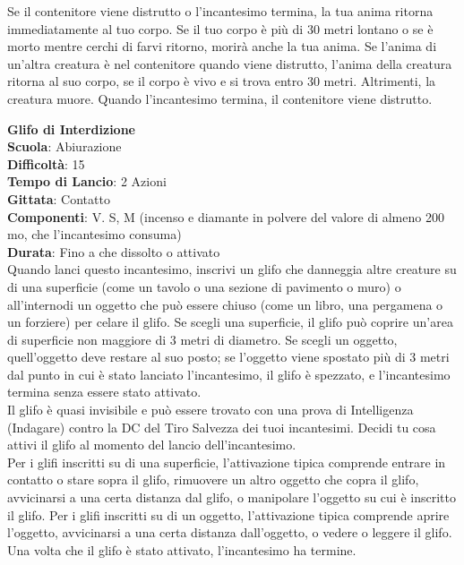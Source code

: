 \begin{multicols}{2}
Se il contenitore viene distrutto o l'incantesimo termina, la tua anima ritorna immediatamente al tuo corpo. Se il tuo corpo è più di 30 metri lontano o se è morto mentre cerchi di farvi ritorno, morirà anche la tua anima. Se l'anima di un'altra creatura è nel contenitore quando viene distrutto, l'anima della creatura ritorna al suo corpo, se il corpo è vivo e si trova entro 30 metri. Altrimenti, la creatura muore. Quando l'incantesimo termina, il contenitore viene distrutto.

\medskip\textbf{Glifo di Interdizione}\\
\textbf{Scuola}: Abiurazione\\
\textbf{Difficoltà}: 15\\
\textbf{Tempo di Lancio}: 2 Azioni\\
\textbf{Gittata}: Contatto\\
\textbf{Componenti}: V. S, M (incenso e diamante in polvere del valore di almeno 200 mo, che l'incantesimo consuma)\\
\textbf{Durata}: Fino a che dissolto o attivato \\
Quando lanci questo incantesimo, inscrivi un glifo che danneggia altre creature su di una superficie (come un tavolo o una sezione di pavimento o muro) o all'internodi un oggetto che può essere chiuso (come un libro, una pergamena o un forziere) per celare il glifo. Se scegli una superficie, il glifo può coprire un'area di superficie non maggiore di 3 metri di diametro. Se scegli un oggetto, quell'oggetto deve restare al suo posto; se l'oggetto viene spostato più di 3 metri dal punto in cui è stato lanciato l'incantesimo, il glifo è spezzato, e l'incantesimo termina senza essere stato attivato.\\
Il glifo è quasi invisibile e può essere trovato con una prova di Intelligenza (Indagare) contro la DC del Tiro Salvezza dei tuoi incantesimi. Decidi tu cosa attivi il glifo al momento del lancio dell'incantesimo.\\
Per i glifi inscritti su di una superficie, l'attivazione tipica comprende entrare in contatto o stare sopra il glifo, rimuovere un altro oggetto che copra il glifo, avvicinarsi a una certa distanza dal glifo, o manipolare l'oggetto su cui è inscritto il glifo. Per i glifi inscritti su di un oggetto, l'attivazione tipica comprende aprire l'oggetto, avvicinarsi a una certa distanza dall'oggetto, o vedere o leggere il glifo. Una volta che il glifo è stato attivato, l'incantesimo ha termine.\\

\end{multicols}
